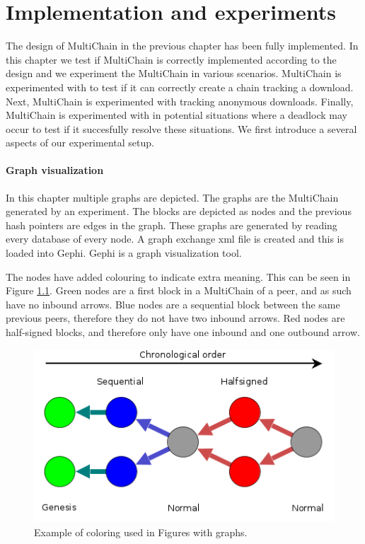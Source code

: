 \chapter{Implementation and experiments}
The design of MultiChain in the previous chapter has been fully implemented.
In this chapter we test if MultiChain is correctly implemented according to the design
and we experiment the MultiChain in various scenarios.
MultiChain is experimented with to test if it can correctly create a chain tracking a download.
Next, MultiChain is experimented with tracking anonymous downloads.
Finally, MultiChain is experimented with in potential situations where a deadlock may occur
to test if it succesfully resolve these situations.
We first introduce a several aspects of our experimental setup.

\subsubsection{Graph visualization}
In this chapter multiple graphs are depicted.
The graphs are the MultiChain generated by an experiment.
The blocks are depicted as nodes and the previous hash pointers are edges in the graph.
These graphs are generated by reading every database of every node.
A graph exchange xml file is created and this is loaded into Gephi.
Gephi is a graph visualization tool.

The nodes have added colouring to indicate extra meaning.
This can be seen in Figure \ref{fig:graph-example}.
Green nodes are a first block in a MultiChain of a peer,
and as such have no inbound arrows.
Blue nodes are a sequential block between the same previous peers,
therefore they do not have two inbound arrows.
Red nodes are half-signed blocks,
and therefore only have one inbound and one outbound arrow.

\begin{figure}[!h]
	\centerline{\includegraphics[scale=0.6]{experimentation/example.png}}
	\caption{Example of coloring used in Figures with graphs.}
	\label{fig:graph-example}
\end{figure}

